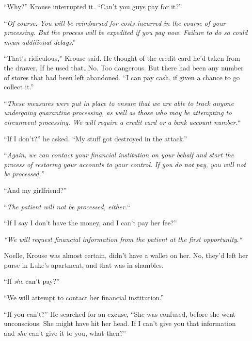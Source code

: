 ``Why?''  Krouse interrupted it.  ``Can't you guys pay for it?''



``\emph{Of course.  You will be reimbursed for costs incurred in the course of your processing.  But the process will be expedited if you pay now.  Failure to do so could mean additional delays}.''



``That's ridiculous,'' Krouse said.  He thought of the credit card he'd taken from the drawer. If he used that\ldots  No.  Too dangerous.  But there had been any number of stores that had been left abandoned.  ``I can pay cash, if given a chance to go collect it.''



``\emph{These measures were put in place to ensure that we are able to track anyone undergoing quarantine processing, as well as those who may be attempting to circumvent processing.  We will require a credit card or a bank account number.}``



``If I don't?'' he asked.  ``My stuff got destroyed in the attack.''



``\emph{Again, we can contact your financial institution on your behalf and start the process of restoring your accounts to your control.  If you do not pay, you will not be processed.''}



``And my girlfriend?''



``\emph{The patient will not be processed, either.}``



``If I say I don't have the money, and I can't pay her fee?''



\emph{``We will request financial information from the patient at the first opportunity}.\emph{``}



Noelle, Krouse was almost certain, didn't have a wallet on her.  No, they'd left her purse in Luke's apartment, and that was in shambles.



``If \emph{she} can't pay?''



``We will attempt to contact her financial institution.''



``If you can't?''  He searched for an excuse, ``She was confused, before she went unconscious.  She might have hit her head.  If I can't give you that information and \emph{she} can't give it to you, what then?''



